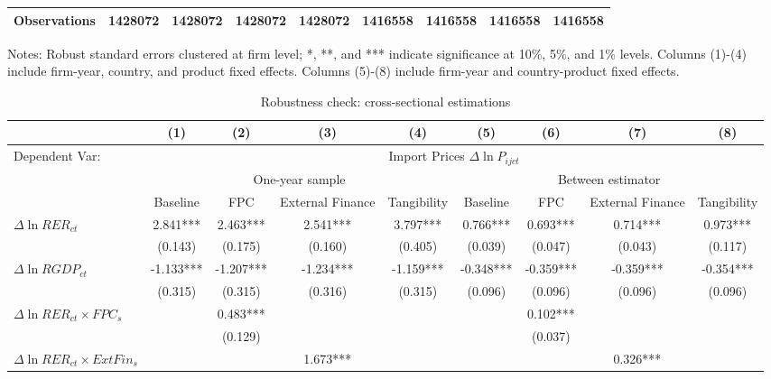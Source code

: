 \begin{table}
\begin{threeparttable}
\begin{tabular}{lcccccccc}
			Observations & 1428072 & 1428072 & 1428072 & 1428072 & 1416558 & 1416558 & 1416558 & 1416558 \\
			\bottomrule
		\end{tabular}
		\begin{tablenotes}
			\footnotesize
			\item Notes: Robust standard errors clustered at firm level; *, **, and *** indicate significance at 10\%, 5\%, and 1\% levels. Columns (1)-(4) include firm-year, country, and product fixed effects.  Columns (5)-(8) include firm-year and country-product fixed effects.
		\end{tablenotes}
	\end{threeparttable}
	\label{tab.robust.fe}
\end{table}

\begin{table}
	\centering
	\caption{Robustness check: cross-sectional estimations}
	\begin{threeparttable}
		\begin{tabular}{lcccccccc}
			\toprule
			& (1)   & (2)   & (3)   & (4) &  (5)  &  (6)  & (7)  & (8)\\
			\midrule
                Dependent Var: & \multicolumn{8}{c}{ Import Prices $\Delta \ln P_{ijct}$} \\
			& \multicolumn{4}{c}{One-year sample} & \multicolumn{4}{c}{Between estimator}\\
			& Baseline & FPC   & External Finance & Tangibility & Baseline & FPC & External Finance & Tangibility\\
			\midrule
			$\Delta \ln RER_{ct}$ & 2.841*** & 2.463*** & 2.541*** & 3.797*** & 0.766*** & 0.693*** & 0.714*** & 0.973*** \\
			& (0.143) & (0.175) & (0.160) & (0.405) & (0.039) & (0.047) & (0.043) & (0.117) \\
			$\Delta \ln RGDP_{ct}$ & -1.133*** & -1.207*** & -1.234*** & -1.159*** & -0.348*** & -0.359*** & -0.359*** & -0.354*** \\
			& (0.315) & (0.315) & (0.316) & (0.315) & (0.096) & (0.096) & (0.096) & (0.096) \\
			$\Delta \ln RER_{ct} \times FPC_{s}$ &   & 0.483*** &       &       &       & 0.102*** &       &  \\
			&   & (0.129) &       &       &       & (0.037) &       &  \\
			$\Delta \ln RER_{ct} \times ExtFin_{s}$ &   &       & 1.673*** &       &       &       & 0.326*** &  \\

\end{tabular}
\end{threeparttable}
\end{table}
